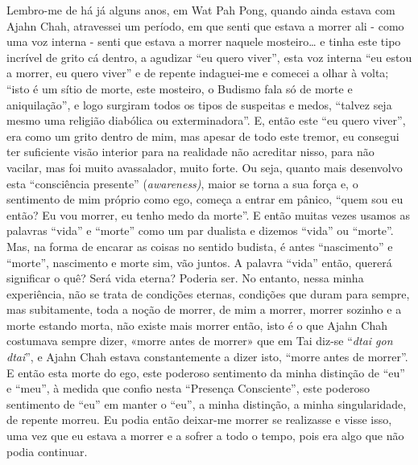 Lembro-me de há já alguns anos, em Wat Pah Pong, quando ainda estava com
Ajahn Chah, atravessei um período, em que senti que estava a morrer ali
- como uma voz interna - senti que estava a morrer naquele mosteiro\ldots{} e
tinha este tipo incrível de grito cá dentro, a agudizar ``eu quero
viver'', esta voz interna ``eu estou a morrer, eu quero viver'' e de
repente indaguei-me e comecei a olhar à volta; ``isto é um sítio de
morte, este mosteiro, o Budismo fala só de morte e aniquilação'', e logo
surgiram todos os tipos de suspeitas e medos, ``talvez seja mesmo uma
religião diabólica ou exterminadora''. E, então este ``eu quero viver'',
era como um grito dentro de mim, mas apesar de todo este tremor, eu
consegui ter suficiente visão interior para na realidade não acreditar
nisso, para não vacilar, mas foi muito avassalador, muito forte. Ou
seja, quanto mais desenvolvo esta ``consciência presente''
(\emph{awareness)}, maior se torna a sua força e, o sentimento de mim
próprio como ego, começa a entrar em pânico, ``quem sou eu então? Eu vou
morrer, eu tenho medo da morte''. E então muitas vezes usamos as
palavras ``vida'' e ``morte'' como um par dualista e dizemos ``vida'' ou
``morte''. Mas, na forma de encarar as coisas no sentido budista, é
antes ``nascimento'' e ``morte'', nascimento e morte sim, vão juntos. A
palavra ``vida'' então, quererá significar o quê? Será vida eterna?
Poderia ser. No entanto, nessa minha experiência, não se trata de
condições eternas, condições que duram para sempre, mas subitamente,
toda a noção de morrer, de mim a morrer, morrer sozinho e a morte
estando morta, não existe mais morrer então, isto é o que Ajahn Chah
costumava sempre dizer, «morre antes de morrer» que em Tai diz-se
``\emph{dtai gon dtai}'', e Ajahn Chah estava constantemente a dizer
isto, ``morre antes de morrer''. E então esta morte do ego, este
poderoso sentimento da minha distinção de ``eu'' e ``meu'', à medida que
confio nesta ``Presença Consciente'', este poderoso sentimento de ``eu''
em manter o ``eu'', a minha distinção, a minha singularidade, de repente
morreu. Eu podia então deixar-me morrer se realizasse e visse isso, uma
vez que eu estava a morrer e a sofrer a todo o tempo, pois era algo que
não podia continuar.

